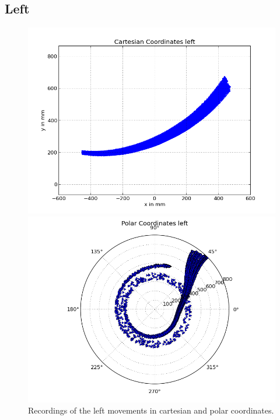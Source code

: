 \documentclass{scrartcl}
\begin{document}
\subsection{Left}
\begin{figure}[H]
\centering
\begin{minipage}{.5\textwidth}
  \centering
  \includegraphics[width=.8\linewidth]{img/left_c.png}
\end{minipage}%
\begin{minipage}{.5\textwidth}
  \centering
  \includegraphics[width=.8\linewidth]{img/left_pc_c.png}
\end{minipage}
\caption{Recordings of the left movements in cartesian and polar coordinates.}
\label{fig:left}
\end{figure}
\end{document}
